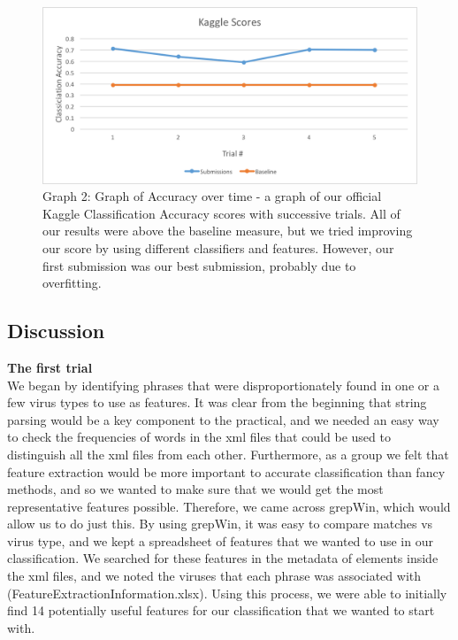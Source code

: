 \documentclass[submit]{harvardml}
\begin{document}
\begin{figure}[H]
\centering
\includegraphics[width=1.0 \textwidth]{Kaggle_graph.png}
\caption*{Graph 2: Graph of Accuracy over time - a graph of our official Kaggle Classification Accuracy scores with successive trials. All of our results were above the baseline measure, but we tried improving our score by using different classifiers and features. However, our first submission was our best submission, probably due to overfitting.}
\end{figure}

\subsection*{Discussion}

\noindent \textbf{The first trial} \\

We began by identifying phrases that were disproportionately found in one or a few virus types to use as features. It was clear from the beginning that string parsing would be a key component to the practical, and we needed an easy way to check the frequencies of words in the xml files that could be used to distinguish all the xml files from each other. Furthermore, as a group we felt that feature extraction would be more important to accurate classification than fancy methods, and so we wanted to make sure that we would get the most representative features possible. Therefore, we came across grepWin, which would allow us to do just this. By using grepWin, it was easy to compare matches vs virus type, and we kept a spreadsheet of features that we wanted to use in our classification. We searched for these features in the metadata of elements inside the xml files, and we noted the viruses that each phrase was associated with (FeatureExtractionInformation.xlsx). Using this process, we were able to initially find 14 potentially useful features for our classification that we wanted to start with. \\
\end{document}
